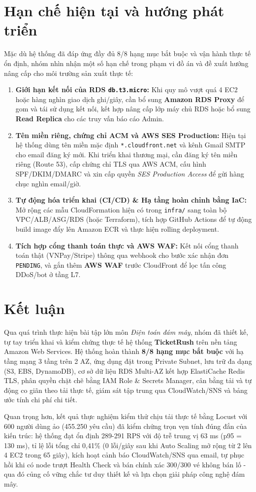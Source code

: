\section{Hạn chế hiện tại và hướng phát triển}
Mặc dù hệ thống đã đáp ứng đầy đủ 8/8 hạng mục bắt buộc và vận hành thực tế ổn định, nhóm nhìn nhận một số hạn chế trong phạm vi đồ án và đề xuất hướng nâng cấp cho môi trường sản xuất thực tế:
\begin{enumerate}[leftmargin=1.5em]
  \item \textbf{Giới hạn kết nối của RDS \texttt{db.t3.micro}:} Khi quy mô vượt quá 4 EC2 hoặc hàng nghìn giao dịch ghi/giây, cần bổ sung \textbf{Amazon RDS Proxy} để gom và tái sử dụng kết nối, kết hợp nâng cấp lớp máy chủ RDS hoặc bổ sung \textbf{Read Replica} cho các truy vấn báo cáo Admin.
  \item \textbf{Tên miền riêng, chứng chỉ ACM và AWS SES Production:} Hiện tại hệ thống dùng tên miền mặc định \texttt{*.cloudfront.net} và kênh Gmail SMTP cho email đăng ký mới. Khi triển khai thương mại, cần đăng ký tên miền riêng (Route 53), cấp chứng chỉ TLS qua AWS ACM, cấu hình SPF/DKIM/DMARC và xin cấp quyền \textit{SES Production Access} để gửi hàng chục nghìn email/giờ.
  \item \textbf{Tự động hóa triển khai (CI/CD) \& Hạ tầng hoàn chỉnh bằng IaC:} Mở rộng các mẫu CloudFormation hiện có trong \texttt{infra/} sang toàn bộ VPC/ALB/ASG/RDS (hoặc Terraform), tích hợp GitHub Actions để tự động build image đẩy lên Amazon ECR và thực hiện rolling deployment.
  \item \textbf{Tích hợp cổng thanh toán thực và AWS WAF:} Kết nối cổng thanh toán thật (VNPay/Stripe) thông qua webhook cho bước xác nhận đơn \texttt{PENDING}, và gắn thêm \textbf{AWS WAF} trước CloudFront để lọc tấn công DDoS/bot ở tầng L7.
\end{enumerate}

\section{Kết luận}
Qua quá trình thực hiện bài tập lớn môn \textit{Điện toán đám mây}, nhóm đã thiết kế, tự tay triển khai và kiểm chứng thực tế hệ thống \textbf{TicketRush} trên nền tảng Amazon Web Services. Hệ thống hoàn thành \textbf{8/8 hạng mục bắt buộc} với hạ tầng mạng 3 tầng trên 2 AZ, ứng dụng đặt trong Private Subnet, lưu trữ đa dạng (S3, EBS, DynamoDB), cơ sở dữ liệu RDS Multi-AZ kết hợp ElastiCache Redis TLS, phân quyền chặt chẽ bằng IAM Role \& Secrets Manager, cân bằng tải và tự động co giãn theo tải thực tế, giám sát tập trung qua CloudWatch/SNS và bảng ước tính chi phí chi tiết.

Quan trọng hơn, kết quả thực nghiệm kiểm thử chịu tải thực tế bằng Locust với 600 người dùng ảo (455.250 yêu cầu) đã kiểm chứng trọn vẹn tính đúng đắn của kiến trúc: hệ thống đạt ổn định 289-291 RPS với độ trễ trung vị 63 ms (p95 = 130 ms), tỉ lệ lỗi tổng chỉ 0,41\% (0 lỗi/giây sau khi Auto Scaling mở rộng từ 2 lên 4 EC2 trong 65 giây), kích hoạt cảnh báo CloudWatch/SNS qua email, tự phục hồi khi có node trượt Health Check và bán chính xác 300/300 vé không bán lố - qua đó củng cố vững chắc tư duy thiết kế và lựa chọn giải pháp công nghệ đám mây.
